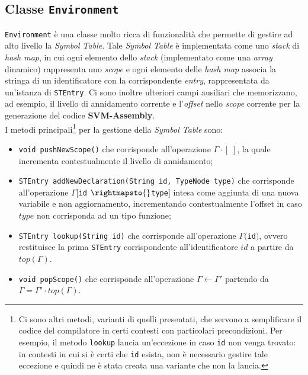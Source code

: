 \documentclass[../report.tex]{subfiles}
\begin{document}
\subsection[Classe Environment]{Classe \texttt{Environment}}\label{ss:environment}
\verb|Environment| è una classe molto ricca di funzionalità che permette di gestire ad alto livello la \textit{Symbol Table}. Tale \textit{Symbol Table} è implementata come uno \textit{stack} di \textit{hash map}, in cui ogni elemento dello \textit{stack} (implementato come una \textit{array} dinamico) rappresenta uno \textit{scope} e ogni elemento delle \textit{hash map} associa la stringa di un identificatore con la corrispondente \textit{entry}, rappresentata da un'istanza di \verb|STEntry|.
Ci sono inoltre ulteriori campi ausiliari che memorizzano, ad esempio, il livello di annidamento corrente e l'\textit{offset} nello \textit{scope} corrente per la generazione del codice \textbf{SVM-Assembly}.\\
I metodi principali\footnote{Ci sono altri metodi, varianti di quelli presentati, che servono a semplificare il codice del compilatore in certi contesti con particolari precondizioni. Per esempio, il metodo \texttt{lookup} lancia un'eccezione in caso \texttt{id} non venga trovato: in contesti in cui si è certi che \texttt{id} esista, non è necessario gestire tale eccezione e quindi ne è stata creata una variante che non la lancia.} per la gestione della \textit{Symbol Table} sono:
\begin{itemize}
    \item \verb|void pushNewScope()| che corrisponde all'operazione $\Gamma{}\cdot{}[\;]$, la quale incrementa contestualmente il livello di annidamento;
    \item \verb|STEntry addNewDeclaration(String id, TypeNode type)| che corrisponde all'operazione $\Gamma{}[$\verb|id| $ \rightmapsto{}$\verb|type|$]$ intesa come aggiunta di una nuova variabile e non aggiornamento, incrementando contestualmente l'offset in caso $type$ non corrisponda ad un tipo funzione;
    \item \verb|STEntry lookup(String id)| che corrisponde all'operazione $\Gamma($\verb|id|$)$, ovvero restituisce la prima \verb|STEntry| corrispondente all'identificatore $id$ a partire da $top(\Gamma)$.
    \item \verb|void popScope()| che corrisponde all'operazione $\Gamma \leftarrow{} \Gamma'$ partendo da $\Gamma = \Gamma'\cdot{}top(\Gamma)$.
\end{itemize}
\end{document}
